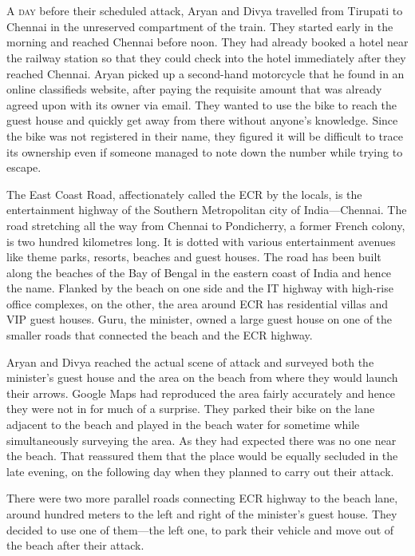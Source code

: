 \chapter{}

\lettrine{A}{ day} before their scheduled attack, Aryan and Divya travelled from Tirupati to
Chennai in the unreserved compartment of the train. They started early in the
morning and reached Chennai before noon. They had already booked a hotel near
the railway station so that they could check into the hotel immediately after
they reached Chennai. Aryan picked up a second-hand motorcycle that he found in
an online classifieds website, after paying the requisite amount that was
already agreed upon with its owner via email. They wanted to use the bike to
reach the guest house and quickly get away from there without anyone's
knowledge. Since the bike was not registered in their name, they figured it will
be difficult to trace its ownership even if someone managed to note down the
number while trying to escape.

The East Coast Road, affectionately called the ECR by the locals, is the
entertainment highway of the Southern Metropolitan city of India—Chennai. The
road stretching all the way from Chennai to Pondicherry, a former French colony,
is two hundred kilometres long. It is dotted with various entertainment avenues
like theme parks, resorts, beaches and guest houses. The road has been built
along the beaches of the Bay of Bengal in the eastern coast of India and hence
the name. Flanked by the beach on one side and the IT highway with high-rise
office complexes, on the other, the area around ECR has residential villas and
VIP guest houses.  Guru, the minister, owned a large guest house on one of the
smaller roads that connected the beach and the ECR highway.

Aryan and Divya reached the actual scene of attack and surveyed both the
minister's guest house and the area on the beach from where they would launch
their arrows. Google Maps had reproduced the area fairly accurately and hence
they were not in for much of a surprise. They parked their bike on the lane
adjacent to the beach and played in the beach water for sometime while
simultaneously surveying the area. As they had expected there was no one near
the beach. That reassured them that the place would be equally secluded in the
late evening, on the following day when they planned to carry out their attack.

There were two more parallel roads connecting ECR highway to the beach lane,
around hundred meters to the left and right of the minister's guest house. They
decided to use one of them—the left one, to park their vehicle and move out of
the beach after their attack.

